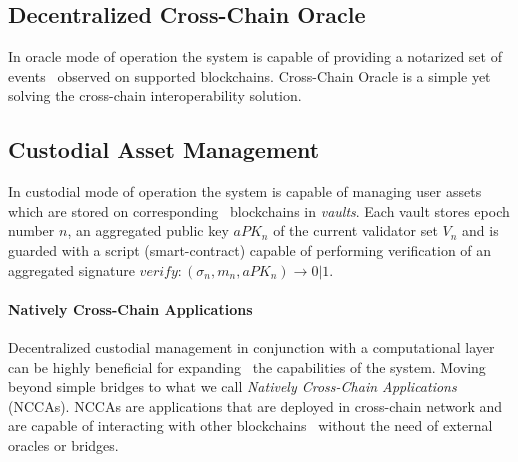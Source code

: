 \subsection{Decentralized Cross-Chain Oracle}\label{subsec:cross-chain-oracle}

In oracle mode of operation the system is capable of providing a notarized set of events \
observed on supported blockchains.
Cross-Chain Oracle is a simple yet solving the cross-chain interoperability solution.

\subsection{Custodial Asset Management}\label{subsec:custodial-asset-management}

In custodial mode of operation the system is capable of managing user assets which are stored on corresponding \
blockchains in \emph{vaults}.
Each vault stores epoch number $n$, an aggregated public key $aPK_n$ of the current validator set $V_n$ and
is guarded with a script (smart-contract) capable of performing verification of
an aggregated signature ${verify: (\sigma_n, m_n, aPK_n) \rightarrow 0 | 1}$.

\paragraph{Natively Cross-Chain Applications}

Decentralized custodial management in conjunction with a computational layer can be highly beneficial for expanding \
the capabilities of the system.
Moving beyond simple bridges to what we call \emph{Natively Cross-Chain Applications} (NCCAs).
NCCAs are applications that are deployed in cross-chain network and are capable of interacting with other blockchains \
without the need of external oracles or bridges.

